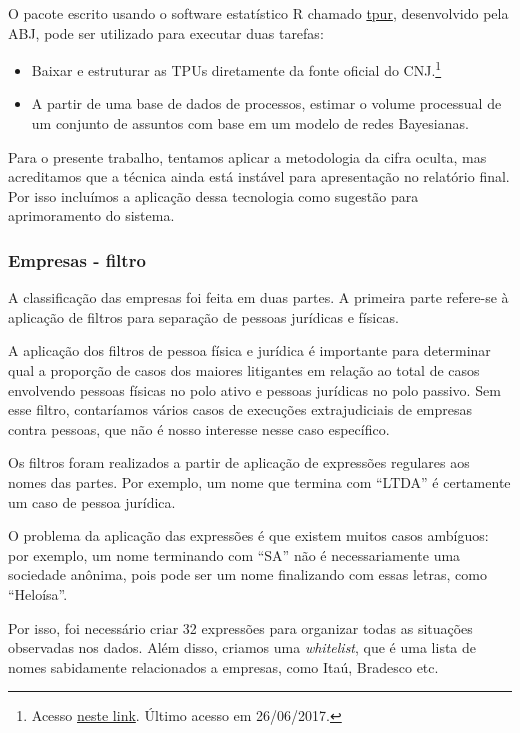 \documentclass[]{report}
\providecommand{\tightlist}{%
  \setlength{\itemsep}{0pt}\setlength{\parskip}{0pt}}
\begin{document}
O pacote escrito usando o software estatístico R chamado
\href{https://github.com/abjur/tpur}{tpur}, desenvolvido pela ABJ, pode
ser utilizado para executar duas tarefas:

\begin{itemize}
\tightlist
\item
  Baixar e estruturar as TPUs diretamente da fonte oficial do
  CNJ.\footnote{Acesso
    \href{https://www.cnj.jus.br/sgt/versoes.php}{neste link}. Último
    acesso em 26/06/2017.}
\item
  A partir de uma base de dados de processos, estimar o volume
  processual de um conjunto de assuntos com base em um modelo de redes
  Bayesianas.
\end{itemize}

Para o presente trabalho, tentamos aplicar a metodologia da cifra
oculta, mas acreditamos que a técnica ainda está instável para
apresentação no relatório final. Por isso incluímos a aplicação dessa
tecnologia como sugestão para aprimoramento do sistema.

\subsubsection{Empresas - filtro}\label{empresas1}

A classificação das empresas foi feita em duas partes. A primeira parte
refere-se à aplicação de filtros para separação de pessoas jurídicas e
físicas.

A aplicação dos filtros de pessoa física e jurídica é importante para
determinar qual a proporção de casos dos maiores litigantes em relação
ao total de casos envolvendo pessoas físicas no polo ativo e pessoas
jurídicas no polo passivo. Sem esse filtro, contaríamos vários casos de
execuções extrajudiciais de empresas contra pessoas, que não é nosso
interesse nesse caso específico.

Os filtros foram realizados a partir de aplicação de expressões
regulares aos nomes das partes. Por exemplo, um nome que termina com
``LTDA'' é certamente um caso de pessoa jurídica.

O problema da aplicação das expressões é que existem muitos casos
ambíguos: por exemplo, um nome terminando com ``SA'' não é
necessariamente uma sociedade anônima, pois pode ser um nome finalizando
com essas letras, como ``Heloísa''.

Por isso, foi necessário criar 32 expressões para organizar todas as
situações observadas nos dados. Além disso, criamos uma
\emph{whitelist}, que é uma lista de nomes sabidamente relacionados a
empresas, como Itaú, Bradesco etc.
\end{document}
